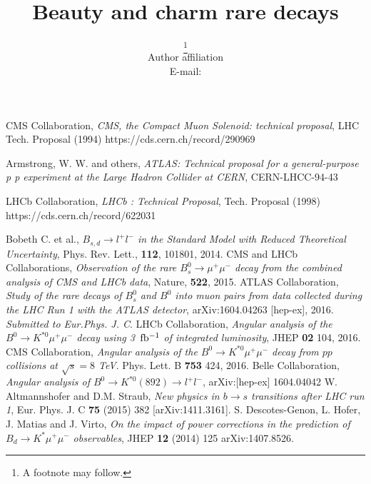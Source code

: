 \documentclass{PoS}
\title{Beauty and charm rare decays}
\author{\speaker{U. De Sanctis, F.Dettori, S. Fiorendi}\thanks{A footnote may follow.}\\
        Author affiliation\\
        E-mail: \email{author@email}}
\begin{document}



\clearpage



\begin{thebibliography}{99}
 CMS Collaboration, 
{\it{CMS, the Compact Muon Solenoid: technical proposal}},
LHC Tech. Proposal (1994) 
https://cds.cern.ch/record/290969

 Armstrong, W. W. and others, 
{\it{ATLAS: Technical proposal for a general-purpose p p experiment at the Large Hadron Collider at CERN}},
CERN-LHCC-94-43 

 LHCb Collaboration, 
{\it{LHCb : Technical Proposal}},
Tech. Proposal (1998) https://cds.cern.ch/record/622031

 Bobeth C. et al., {\it{$B_{s,d} \to l^+ l^-$ in the Standard Model with Reduced Theoretical Uncertainty}}, Phys. Rev. Lett., {\bf{112}}, 101801, 2014.
 CMS and LHCb Collaborations, {\it{Observation of the rare $B^0_s\rightarrow\mu^+\mu^-$ decay from the combined analysis of CMS and LHCb data}}, Nature, {\bf{522}}, 2015.
 ATLAS Collaboration, {\it{Study of the rare decays of $B^0_s$ and $B^0$  into muon pairs from data collected during the LHC Run 1 with the ATLAS detector}}, arXiv:1604.04263 [hep-ex], 2016. {\it{Submitted to Eur.Phys. J. C}}.
 LHCb Collaboration, {\it{Angular analysis of the $B^0 \to K^{*0}  \mu^+ \mu^-$ decay using 3~${\rm{fb^{-1}}}$ of integrated luminosity}}, JHEP {\bf{02}} 104, 2016. 
 CMS Collaboration, {\it{Angular analysis of the $B^0 \to K^{*0}  \mu^+ \mu^-$  decay from $pp$ collisions at $\sqrt{s} = 8$ TeV}}. Phys. Lett. B {\bf{753}} 424, 2016.
 Belle Collaboration, {\it{Angular analysis of $B^0 \to K^{*0}(892) \to l^+ l^-$}}, arXiv:[hep-ex] 1604.04042
 W. Altmannshofer and D.M. Straub, {\it{New physics in $b \to s$ transitions after LHC run 1}}, Eur. Phys. J. C {\bf{75}} (2015) 382 [arXiv:1411.3161].
 S. Descotes-Genon, L. Hofer, J. Matias and J. Virto, {\it{On the impact of power corrections in the prediction of $B_d \to K^* \mu^+ \mu^-$ observables}}, JHEP {\bf{12}} (2014) 125 arXiv:1407.8526.

\end{thebibliography}
\end{document}
